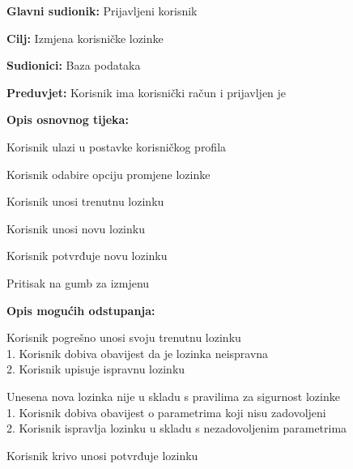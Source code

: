 					\noindent {}
					\begin{packed_item}
						\item \textbf{Glavni sudionik:} Prijavljeni korisnik
						\item \textbf{Cilj:} Izmjena korisničke lozinke
						\item \textbf{Sudionici:} Baza podataka
						\item \textbf{Preduvjet:} Korisnik ima korisnički račun i prijavljen je
						\item \textbf{Opis osnovnog tijeka:}
						\begin{packed_enum}
							\item Korisnik ulazi u postavke korisničkog profila
							\item Korisnik odabire opciju promjene lozinke
							\item Korisnik unosi trenutnu lozinku
							\item Korisnik unosi novu lozinku
							\item Korisnik potvrđuje novu lozinku
							\item Pritisak na gumb za izmjenu
						\end{packed_enum}
						\item \textbf{Opis mogućih odstupanja:}
						\begin{packed_item}
							\item [3.a] Korisnik pogrešno unosi svoju trenutnu lozinku
							\\1. Korisnik dobiva obavijest da je lozinka neispravna
							\\2. Korisnik upisuje ispravnu lozinku
							\item [4.a] Unesena nova lozinka nije u skladu s pravilima za sigurnost lozinke
							\\1. Korisnik dobiva obavijest o parametrima koji nisu zadovoljeni
							\\2. Korisnik ispravlja lozinku u skladu s nezadovoljenim parametrima
							\item [5.a] Korisnik krivo unosi potvrđuje lozinku
						\end{packed_item}
					\end{packed_item}
					
